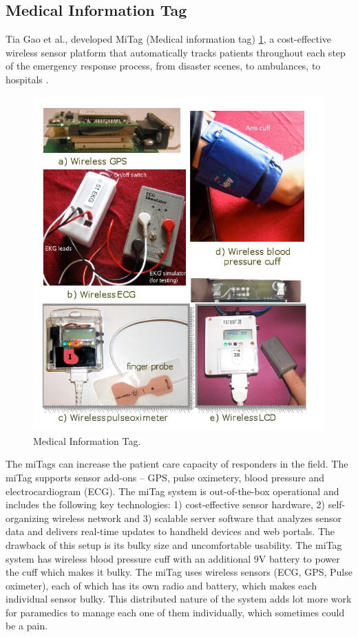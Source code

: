 \subsection{Medical Information Tag}

Tia Gao et al., developed MiTag (Medical information tag) \ref{fig:miTag}, a cost-effective 
wireless sensor platform that automatically tracks patients 
throughout each step of the emergency response process, from disaster scenes, to ambulances, to hospitals \cite{miTag}.

\begin{figure}
	\centering
	\includegraphics[scale = 0.6 ]{miTag}
	\caption{Medical Information Tag. \cite{miTag}\label{fig:miTag}}
\end{figure}

The miTags can increase 
the patient care capacity of responders in the field. The miTag supports sensor add-ons – GPS, pulse oximetery, blood pressure and electrocardiogram (ECG). 
The miTag system is out-of-the-box operational and includes the following key technologies: 1) cost-effective sensor hardware, 2) 
self-organizing wireless network and 3) scalable server software that analyzes sensor data and delivers real-time updates to handheld devices and web portals. The drawback of this setup is its bulky size and uncomfortable usability. The miTag system has wireless blood pressure cuff with an additional 9V battery to power the cuff which makes it bulky. The miTag uses wireless sensors (ECG, GPS, Pulse oximeter), each of which has its own radio and battery, which makes each individual sensor bulky. This distributed nature of the system adds lot more work for paramedics to manage each one of them individually, which sometimes could be a pain. 


